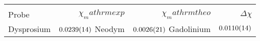 
\begin{table}[!h]
\begin{center}
\begin{tabular}{|l|r|r|r|}
\hline
 &&&\\
 Probe & $\chi_mathrm{exp}$ & $\chi_mathrm{theo}$ & $\Delta\chi$ \\
\hline
\hline

Dysprosium & $\SI{0.0239 (14)}{}$ 
Neodym     & $\SI{0.0026 (21)}{}$
Gadolinium & $\SI{0.0110 (14)}{}$

\hline
\end{tabular}
\caption[]{}
\label{}
\end{center}
\end{table}